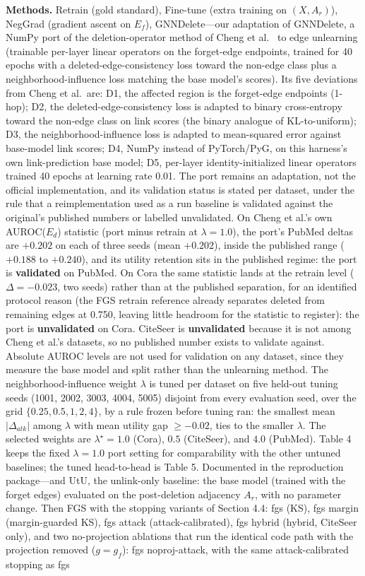 \documentclass[pdflatex,sn-basic,Numbered]{sn-jnl}
\begin{document}
\textbf{Methods.} Retrain (gold standard), Fine-tune (extra training on $(X, A_r)$), NegGrad (gradient ascent on $E_f$), GNNDelete---our adaptation of GNNDelete, a NumPy port of the deletion-operator method of Cheng et al.\ \cite{gnndelete2023} to edge unlearning (trainable per-layer linear operators on the forget-edge endpoints, trained for 40 epochs with a deleted-edge-consistency loss toward the non-edge class plus a neighborhood-influence loss matching the base model's scores). Its five deviations from Cheng et al.\ are: D1, the affected region is the forget-edge endpoints (1-hop); D2, the deleted-edge-consistency loss is adapted to binary cross-entropy toward the non-edge class on link scores (the binary analogue of KL-to-uniform); D3, the neighborhood-influence loss is adapted to mean-squared error against base-model link scores; D4, NumPy instead of PyTorch/PyG, on this harness's own link-prediction base model; D5, per-layer identity-initialized linear operators trained 40 epochs at learning rate 0.01. The port remains an adaptation, not the official implementation, and its validation status is stated per dataset, under the rule that a reimplementation used as a run baseline is validated against the original's published numbers or labelled unvalidated. On Cheng et al.'s own AUROC($E_d$) statistic (port minus retrain at $\lambda = 1.0$), the port's PubMed deltas are $+0.202$ on each of three seeds (mean $+0.202$), inside the published range ($+0.188$ to $+0.240$), and its utility retention sits in the published regime: the port is \textbf{validated} on PubMed. On Cora the same statistic lands at the retrain level ($\Delta = -0.023$, two seeds) rather than at the published separation, for an identified protocol reason (the FGS retrain reference already separates deleted from remaining edges at 0.750, leaving little headroom for the statistic to register): the port is \textbf{unvalidated} on Cora. CiteSeer is \textbf{unvalidated} because it is not among Cheng et al.'s datasets, so no published number exists to validate against. Absolute AUROC levels are not used for validation on any dataset, since they measure the base model and split rather than the unlearning method. The neighborhood-influence weight $\lambda$ is tuned per dataset on five held-out tuning seeds (1001, 2002, 3003, 4004, 5005) disjoint from every evaluation seed, over the grid $\{0.25, 0.5, 1, 2, 4\}$, by a rule frozen before tuning ran: the smallest mean $|\Delta_{atk}|$ among $\lambda$ with mean utility gap $\geq -0.02$, ties to the smaller $\lambda$. The selected weights are $\lambda^\star = 1.0$ (Cora), $0.5$ (CiteSeer), and $4.0$ (PubMed). Table 4 keeps the fixed $\lambda = 1.0$ port setting for comparability with the other untuned baselines; the tuned head-to-head is Table 5. Documented in the reproduction package---and UtU, the unlink-only baseline: the base model (trained with the forget edges) evaluated on the post-deletion adjacency $A_r$, with no parameter change. Then FGS with the stopping variants of Section 4.4: fgs (KS), fgs margin (margin-guarded KS), fgs attack (attack-calibrated), fgs hybrid (hybrid, CiteSeer only), and two no-projection ablations that run the identical code path with the projection removed ($g = g_f$): fgs noproj-attack, with the same attack-calibrated stopping as fgs 
\end{document}
